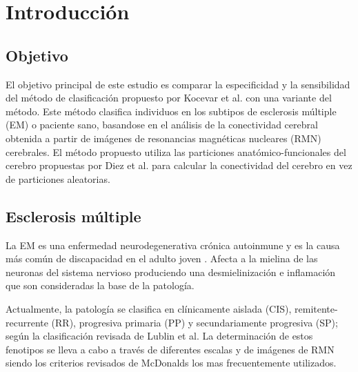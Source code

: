 \documentclass[fleqn,10pt]{UICArticle} %
\affiliation{\textsuperscript{1}\textit{Facultad de Medicina, Universitat Internacional de Catalunya, Barcelona, Spain}}
\affiliation{*\textbf{Datos de contacto}: gabriel.mp@uic.es} %
\begin{document}
\flushbottom 

\maketitle

\tableofcontents

\thispagestyle{empty} 


\section{Introducción}

\subsection{Objetivo}

El objetivo principal de este estudio es comparar la especificidad y la sensibilidad del método de clasificación propuesto por Kocevar et al.\cite{Kocevar2016} con una variante del método. Este método clasifica individuos en los subtipos de esclerosis múltiple (EM) o paciente sano, basandose en el análisis de la conectividad cerebral obtenida a partir de imágenes de  resonancias magnéticas nucleares (RMN) cerebrales. El método propuesto  utiliza las particiones anatómico-funcionales del cerebro propuestas por Diez et al.\cite{Diez2015} para calcular la conectividad del cerebro en vez de particiones aleatorias.


\subsection{Esclerosis múltiple}

La EM es una enfermedad neurodegenerativa crónica autoinmune y es la causa más común de discapacidad en el adulto joven \cite{Polman2011}. Afecta a la mielina de las neuronas del sistema nervioso produciendo una desmielinización e inflamación que son consideradas la base de la patología.

Actualmente, la patología se clasifica en clínicamente aislada (CIS), remitente-recurrente (RR), progresiva primaria (PP) y secundariamente progresiva (SP); según la clasificación revisada de Lublin et al\cite{Lublin2014}. La determinación de estos fenotipos se lleva a cabo a través de diferentes escalas y de imágenes de RMN siendo los criterios revisados de McDonalds \cite{Polman20112} los mas frecuentemente utilizados.
\end{document}
